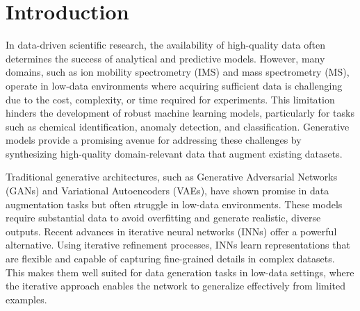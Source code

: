 \documentclass[sigconf]{acmart}
\begin{document}


\maketitle

\section{Introduction}

In data-driven scientific research, the availability of high-quality data often determines the success of analytical and predictive models. However, many domains, such as ion mobility spectrometry (IMS) and mass spectrometry (MS), operate in low-data environments where acquiring sufficient data is challenging due to the cost, complexity, or time required for experiments. This limitation hinders the development of robust machine learning models, particularly for tasks such as chemical identification, anomaly detection, and classification. Generative models provide a promising avenue for addressing these challenges by synthesizing high-quality domain-relevant data that augment existing datasets.\cite{Vadakedath2022MS}

Traditional generative architectures, such as Generative Adversarial Networks (GANs) and Variational Autoencoders (VAEs), have shown promise in data augmentation tasks but often struggle in low-data environments. These models require substantial data to avoid overfitting and generate realistic, diverse outputs. Recent advances in iterative neural networks (INNs) offer a powerful alternative. Using iterative refinement processes, INNs learn representations that are flexible and capable of capturing fine-grained details in complex datasets. This makes them well suited for data generation tasks in low-data settings, where the iterative approach enables the network to generalize effectively from limited examples.\cite{hershey2024rethinking}
\end{document}

